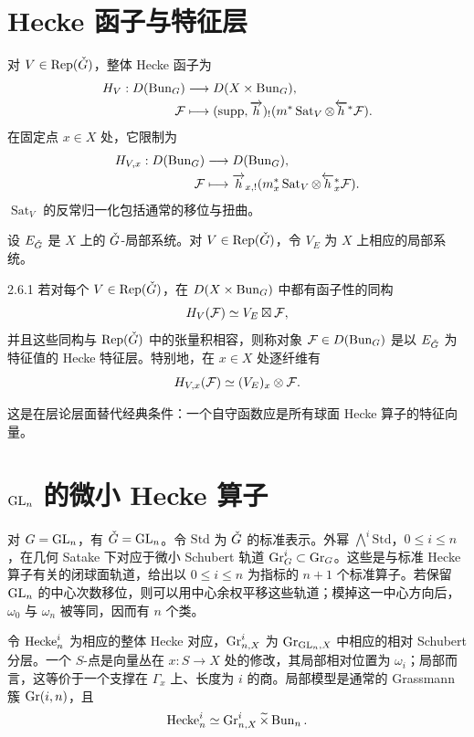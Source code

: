 \section{Hecke 函子与特征层}\label{sec:2.6}
对 $V\in\operatorname{Rep}(\check{G})$，整体 Hecke 函子为
\[
\begin{aligned}
H_V:D(\operatorname{Bun}_G)&\longrightarrow D(X\times\operatorname{Bun}_G),\\
\mathcal{F}&\longmapsto(\operatorname{supp},\overrightarrow h)_!(m^*\operatorname{Sat}_V\otimes\overleftarrow h^*\mathcal{F}).
\end{aligned}
\]
在固定点 $x\in X$ 处，它限制为
\[
\begin{aligned}
H_{V,x}:D(\operatorname{Bun}_G)&\longrightarrow D(\operatorname{Bun}_G),\\
\mathcal{F}&\longmapsto\overrightarrow h_{x,!}(m_x^*\operatorname{Sat}_V\otimes\overleftarrow h_x^*\mathcal{F}).
\end{aligned}
\]
$\operatorname{Sat}_V$ 的反常归一化包括通常的移位与扭曲。

设 $E_{\check{G}}$ 是 $X$ 上的 $\check{G}$-局部系统。对 $V\in\operatorname{Rep}(\check{G})$，令 $V_E$ 为 $X$ 上相应的局部系统。
\begin{definition}{}{2.6.1}
若对每个 $V\in\operatorname{Rep}(\check{G})$，在 $D(X\times\operatorname{Bun}_G)$ 中都有函子性的同构
\[H_V(\mathcal{F})\simeq V_E\boxtimes\mathcal{F},\]
并且这些同构与 $\operatorname{Rep}(\check{G})$ 中的张量积相容，则称对象 $\mathcal{F}\in D(\operatorname{Bun}_G)$ 是以 $E_{\check{G}}$ 为特征值的 Hecke 特征层。特别地，在 $x\in X$ 处逐纤维有
\[H_{V,x}(\mathcal{F})\simeq(V_E)_x\otimes\mathcal{F}.\]
\end{definition}

这是在层论层面替代经典条件：一个自守函数应是所有球面 Hecke 算子的特征向量。
\section{\texorpdfstring{$\operatorname{GL}_n$}{GLₙ} 的微小 Hecke 算子}\label{sec:2.7}
对 $G=\operatorname{GL}_n$，有 $\check{G}=\operatorname{GL}_n$。令 $\mathrm{Std}$ 为 $\check{G}$ 的标准表示。外幂 $\bigwedge^i\mathrm{Std}$，$0\le i\le n$，在几何 Satake 下对应于微小 Schubert 轨道 $\operatorname{Gr}_G^i\subset\operatorname{Gr}_G$。这些是与标准 Hecke 算子有关的闭球面轨道，给出以 $0\le i\le n$ 为指标的 $n+1$ 个标准算子。若保留 $\operatorname{GL}_n$ 的中心次数移位，则可以用中心余权平移这些轨道；模掉这一中心方向后，$\omega_0$ 与 $\omega_n$ 被等同，因而有 $n$ 个类。

令 $\operatorname{Hecke}_n^i$ 为相应的整体 Hecke 对应，$\operatorname{Gr}_{n,X}^i$ 为 $\operatorname{Gr}_{\operatorname{GL}_n,X}$ 中相应的相对 Schubert 分层。一个 $S$-点是向量丛在 $x:S\to X$ 处的修改，其局部相对位置为 $\omega_i$；局部而言，这等价于一个支撑在 $\Gamma_x$ 上、长度为 $i$ 的商。局部模型是通常的 Grassmann 簇 $\operatorname{Gr}(i,n)$，且
\[\operatorname{Hecke}_n^i\simeq\operatorname{Gr}_{n,X}^i\widetilde\times\operatorname{Bun}_n.\]

